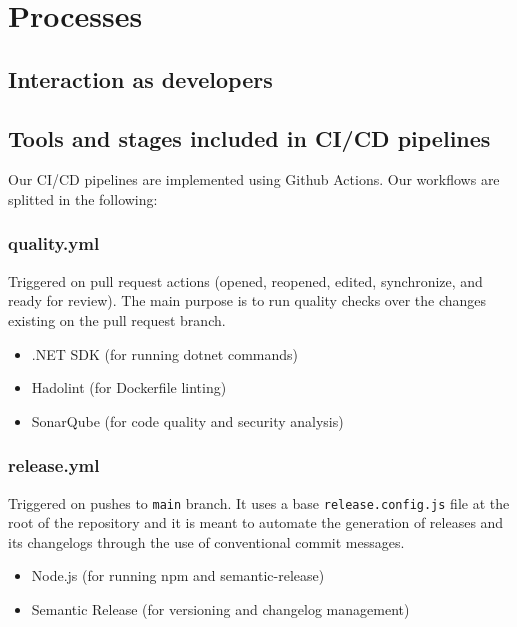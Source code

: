 \section{Processes}

\subsection{Interaction as developers}

\subsection{Tools and stages included in CI/CD pipelines}
\label{tools-and-stages-ci-cd}
Our CI/CD pipelines are implemented using Github Actions. Our workflows are splitted in the following:

\subsubsection{quality.yml}
Triggered on pull request actions (opened, reopened, edited, synchronize, and ready for review). The main purpose is to run quality checks over the changes existing on the pull request branch.

\begin{itemize}
    \item .NET SDK (for running dotnet commands)
    \item Hadolint (for Dockerfile linting)
    \item SonarQube (for code quality and security analysis)
\end{itemize}

\subsubsection{release.yml}
Triggered on pushes to \texttt{main} branch. It uses a base \texttt{release.config.js} file at the root of the repository and it is meant to automate the generation of releases and its changelogs through the use of conventional commit messages.
\begin{itemize}
    \item Node.js (for running npm and semantic-release)
    \item Semantic Release (for versioning and changelog management)
\end{itemize}


